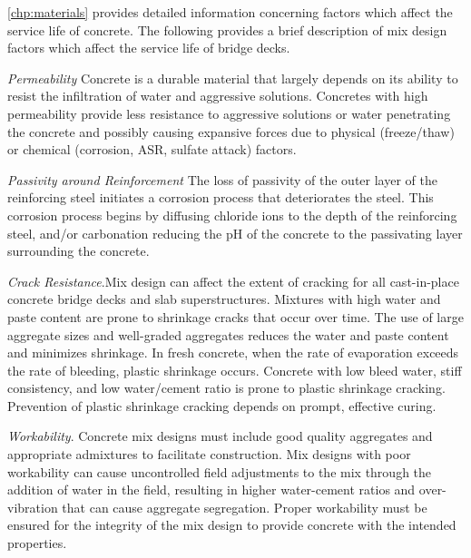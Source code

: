 \cref{chp:materials} provides detailed information concerning factors which affect the service life of concrete. The following provides a brief description of mix design factors which affect the service life of bridge decks.

\emph{Permeability} Concrete is a durable material that largely depends on its ability to resist the infiltration of water and aggressive solutions. Concretes with high permeability provide less resistance to aggressive solutions or water penetrating the concrete and possibly causing expansive forces due to physical (freeze/thaw) or chemical (corrosion, ASR, sulfate attack) factors.

\emph{Passivity around Reinforcement} The loss of passivity of the outer layer of the reinforcing steel initiates a corrosion process that deteriorates the steel. This corrosion process begins by diffusing chloride ions to the depth of the reinforcing steel, and/or carbonation reducing the pH of the concrete to the passivating layer surrounding the concrete.

\emph{Crack Resistance}.Mix design can affect the extent of cracking for all cast-in-place concrete bridge decks and slab superstructures. Mixtures with high water and paste content are prone to shrinkage cracks that occur over time. The use of large aggregate sizes and well-graded aggregates reduces the water and paste content and minimizes shrinkage. In fresh concrete, when the rate of evaporation exceeds the rate of bleeding, plastic shrinkage occurs. Concrete with low bleed water, stiff consistency, and low water/cement ratio is prone to plastic shrinkage cracking.  Prevention of plastic shrinkage cracking depends on prompt, effective curing.

\emph{Workability}. Concrete mix designs must include good quality aggregates and appropriate admixtures to facilitate construction. Mix designs with poor workability can cause uncontrolled field adjustments to the mix through the addition of water in the field, resulting in higher water-cement ratios and over-vibration that can cause aggregate segregation. Proper workability must be ensured for the integrity of the mix design to provide concrete with the intended properties.

